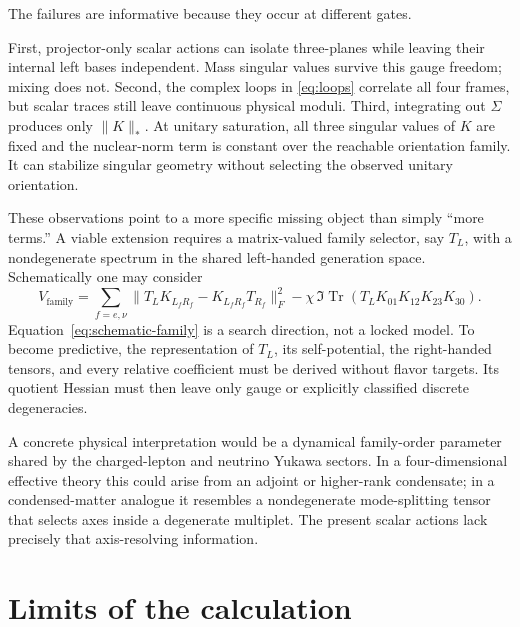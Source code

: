 \documentclass[11pt]{article}
\newcommand{\Tr}{\operatorname{Tr}}
\begin{document}
The failures are informative because they occur at different gates.

First, projector-only scalar actions can isolate three-planes while leaving their internal left bases independent.  Mass singular values survive this gauge freedom; mixing does not.  Second, the complex loops in \cref{eq:loops} correlate all four frames, but scalar traces still leave continuous physical moduli.  Third, integrating out $\Sigma$ produces only $\|K\|_*$.  At unitary saturation, all three singular values of $K$ are fixed and the nuclear-norm term is constant over the reachable orientation family.  It can stabilize singular geometry without selecting the observed unitary orientation.

These observations point to a more specific missing object than simply ``more terms.''  A viable extension requires a matrix-valued family selector, say $T_L$, with a nondegenerate spectrum in the shared left-handed generation space.  Schematically one may consider
\begin{equation}
  V_{\mathrm{family}}
  =\sum_{f=e,\nu}
   \|T_LK_{L_fR_f}-K_{L_fR_f}T_{R_f}\|_F^2
  -\chi\,\Im\Tr\!\left(T_LK_{01}K_{12}K_{23}K_{30}\right).
  \label{eq:schematic-family}
\end{equation}
Equation~\eqref{eq:schematic-family} is a search direction, not a locked model.  To become predictive, the representation of $T_L$, its self-potential, the right-handed tensors, and every relative coefficient must be derived without flavor targets.  Its quotient Hessian must then leave only gauge or explicitly classified discrete degeneracies.

A concrete physical interpretation would be a dynamical family-order parameter shared by the charged-lepton and neutrino Yukawa sectors.  In a four-dimensional effective theory this could arise from an adjoint or higher-rank condensate; in a condensed-matter analogue it resembles a nondegenerate mode-splitting tensor that selects axes inside a degenerate multiplet.  The present scalar actions lack precisely that axis-resolving information.

\section{Limits of the calculation}
\label{sec:limits}
\end{document}

